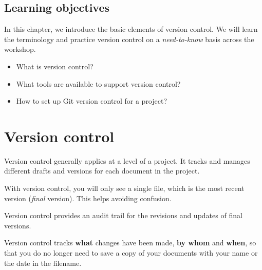 \documentclass[
  letterpaper,
  DIV=11,
  numbers=noendperiod,
  oneside]{scrreprt}
\begin{document}
\hypertarget{learning-objectives-1}{%
\subsection{Learning objectives}\label{learning-objectives-1}}

In this chapter, we introduce the basic elements of version control. We
will learn the terminology and practice version control on a
\emph{need-to-know} basis across the workshop.

\begin{itemize}
\item
  What is version control?
\item
  What tools are available to support version control?
\item
  How to set up Git version control for a project?
\end{itemize}

\hypertarget{version-control}{%
\section{Version control}\label{version-control}}

Version control generally applies at a level of a project. It tracks and
manages different drafts and versions for each document in the project.

\begin{tcolorbox}[enhanced jigsaw, colbacktitle=quarto-callout-important-color!10!white, titlerule=0mm, breakable, opacityback=0, opacitybacktitle=0.6, left=2mm, coltitle=black, colback=white, title=\textcolor{quarto-callout-important-color}{\faExclamation}\hspace{0.5em}{Important}, rightrule=.15mm, colframe=quarto-callout-important-color-frame, toprule=.15mm, bottomtitle=1mm, toptitle=1mm, arc=.35mm, bottomrule=.15mm, leftrule=.75mm]
With version control, you will only see a single file, which is the most
recent version (\emph{final} version). This helps avoiding confusion.
\end{tcolorbox}

Version control provides an audit trail for the revisions and updates of
final versions.

\begin{tcolorbox}[enhanced jigsaw, colbacktitle=quarto-callout-tip-color!10!white, titlerule=0mm, breakable, opacityback=0, opacitybacktitle=0.6, left=2mm, coltitle=black, colback=white, title=\textcolor{quarto-callout-tip-color}{\faLightbulb}\hspace{0.5em}{Tip}, rightrule=.15mm, colframe=quarto-callout-tip-color-frame, toprule=.15mm, bottomtitle=1mm, toptitle=1mm, arc=.35mm, bottomrule=.15mm, leftrule=.75mm]
Version control tracks \textbf{what} changes have been made, \textbf{by
whom} and \textbf{when}, so that you do no longer need to save a copy of
your documents with your name or the date in the filename.
\end{tcolorbox}
\end{document}
